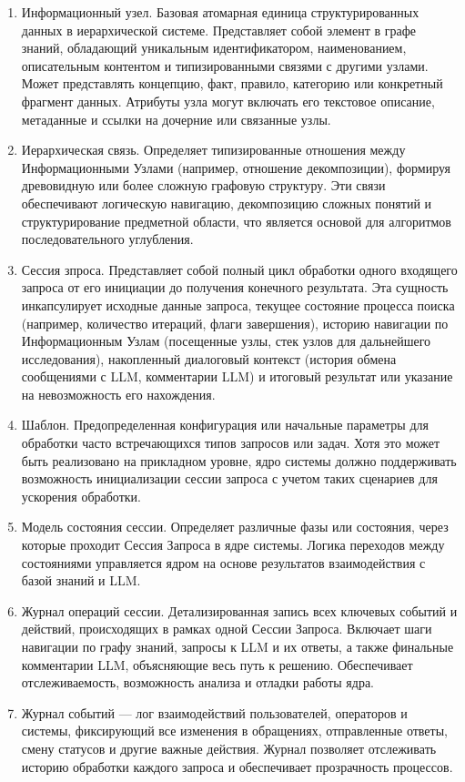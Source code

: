 \begin{enumerate}[label=\arabic*]
    \item Информационный узел. Базовая атомарная единица структурированных данных в иерархической системе. Представляет собой элемент в графе знаний, обладающий уникальным идентификатором, наименованием, описательным контентом и типизированными связями с другими узлами. Может представлять концепцию, факт, правило, категорию или конкретный фрагмент данных. Атрибуты узла могут включать его текстовое описание, метаданные и ссылки на дочерние или связанные узлы.

    \item Иерархическая связь. Определяет типизированные отношения между Информационными Узлами (например, отношение декомпозиции), формируя древовидную или более сложную графовую структуру. Эти связи обеспечивают логическую навигацию, декомпозицию сложных понятий и структурирование предметной области, что является основой для алгоритмов последовательного углубления.

    \item Сессия зпроса. Представляет собой полный цикл обработки одного входящего запроса от его инициации до получения конечного результата. Эта сущность инкапсулирует исходные данные запроса, текущее состояние процесса поиска (например, количество итераций, флаги завершения), историю навигации по Информационным Узлам (посещенные узлы, стек узлов для дальнейшего исследования), накопленный диалоговый контекст (история обмена сообщениями с LLM, комментарии LLM) и итоговый результат или указание на невозможность его нахождения.
    
    \item Шаблон. Предопределенная конфигурация или начальные параметры для обработки часто встречающихся типов запросов или задач. Хотя это может быть реализовано на прикладном уровне, ядро системы должно поддерживать возможность инициализации сессии запроса с учетом таких сценариев для ускорения обработки.
    
    \item Модель состояния сессии. Определяет различные фазы или состояния, через которые проходит Сессия Запроса в ядре системы. Логика переходов между состояниями управляется ядром на основе результатов взаимодействия с базой знаний и LLM.
    
    \item Журнал операций сессии. Детализированная запись всех ключевых событий и действий, происходящих в рамках одной Сессии Запроса. Включает шаги навигации по графу знаний, запросы к LLM и их ответы, а также финальные комментарии LLM, объясняющие весь путь к решению. Обеспечивает отслеживаемость, возможность анализа и отладки работы ядра.
    
    \item Журнал событий — лог взаимодействий пользователей, операторов и системы, фиксирующий все изменения в обращениях, отправленные ответы, смену статусов и другие важные действия. Журнал позволяет отслеживать историю обработки каждого запроса и обеспечивает прозрачность процессов.
    
\end{enumerate}

